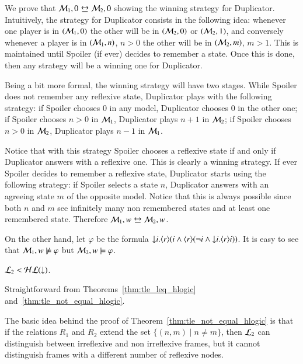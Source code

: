 \begin{pf}
We prove that $\model_1,0\bisim\model_2,0$ showing the winning
strategy for Duplicator. Intuitively, the strategy for Duplicator
consists in the following idea: whenever one player is in
$(\mathcal{M}_1,0)$ the other will be in $(\mathcal{M}_2,0)$ or
$(\mathcal{M}_2,1)$, and conversely whenever a player is in
$(\mathcal{M}_1,n)$, $n>0$ the other will be in $(\mathcal{M}_2,m)$, $m>1$.
This is maintained until Spoiler (if ever) decides to remember a
state. Once this is done, then any strategy will be a winning one
for Duplicator.


Being a bit more formal, the winning strategy will have two stages. While Spoiler does not remember any reflexive
state, Duplicator plays with the following strategy: if Spoiler
chooses $0$ in any model, Duplicator chooses $0$ in the other one;
if Spoiler chooses $n>0$ in $\mathcal{M}_1$, Duplicator plays $n+1$ in
$\mathcal{M}_2$; if Spoiler chooses $n>0$ in $\mathcal{M}_2$, Duplicator plays
$n-1$ in $\mathcal{M}_1$.

Notice that with this strategy Spoiler chooses
a reflexive state if and only if Duplicator answers with a reflexive
one. This is clearly a winning strategy. If ever Spoiler decides to
remember a reflexive state, Duplicator starts using the following
strategy: if Spoiler selects a state $n$, Duplicator answers with an
agreeing state $m$ of the opposite model. Notice that this is always
possible since both $n$ and $m$ see infinitely many non remembered
states and at least one remembered state. Therefore $\model_1,w \bisim \model_2, w$.

On the other hand, let $\varphi$ be the formula ${\downarrow} i. \langle r \rangle(i
\land \langle r \rangle(\lnot i \land {\downarrow} i.\langle r \rangle i))$. It is easy to see
that $\mathcal{M}_1, w \not \models \varphi$ but $\mathcal{M}_2, w \models
\varphi$.
\end{pf}

\begin{cor}
$\mathcal{L}_2<\mathcal{HL}({\downarrow})$.
\end{cor}

\begin{pf}
Straightforward from Theorems~\ref{thm:tle_leq_hlogic}
and~\ref{thm:tle_not_equal_hlogic}.
\end{pf}

The basic idea behind the proof of
Theorem~\ref{thm:tle_not_equal_hlogic} is that if the relations
$R_1$ and $R_2$ extend the set $\{(n,m) \mid n\not= m\}$, then
$\mathcal{L}_2$ can distinguish between irreflexive and non irreflexive
frames, but it cannot distinguish frames with a different number of
reflexive nodes.


